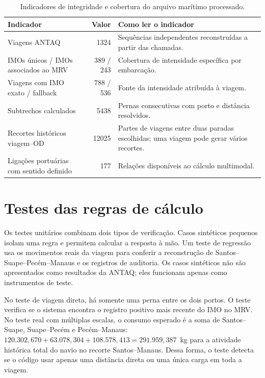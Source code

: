 \begin{table}[htbp]
\centering
\small
\caption{Indicadores de integridade e cobertura do arquivo marítimo processado.}
\label{tab:integridade-maritima}
\begin{tabularx}{\textwidth}{Y r Y}
\toprule
Indicador & Valor & Como ler o indicador \\
\midrule
Viagens ANTAQ & \num{1324} & Sequências independentes reconstruídas a partir das chamadas.\\
IMOs únicos / IMOs associados ao MRV & \num{389} / \num{243} & Cobertura de intensidade específica por embarcação.\\
Viagens com IMO exato / fallback & \num{788} / \num{536} & Fonte da intensidade atribuída à viagem.\\
Subtrechos calculados & \num{5438} & Pernas consecutivas com porto e distância resolvidos.\\
Recortes históricos viagem--OD & \num{12025} & Partes de viagens entre duas paradas escolhidas; uma viagem pode gerar vários recortes.\\
Ligações portuárias com sentido definido & \num{177} & Relações disponíveis ao cálculo multimodal.\\
\bottomrule
\end{tabularx}
\end{table}

\section{Testes das regras de cálculo}
\label{sec:testes-regras-maritimas}

Os testes unitários combinam dois tipos de verificação. Casos sintéticos pequenos isolam uma regra e permitem calcular a resposta à mão. Um teste de regressão usa os movimentos reais da viagem  para conferir a reconstrução de Santos--Suape--Pecém--Manaus e os registros de auditoria. Os casos sintéticos não são apresentados como resultados da ANTAQ; eles funcionam apenas como instrumentos de teste.

No teste de viagem direta, há somente uma perna entre os dois portos. O teste verifica se o sistema encontra o registro positivo mais recente do IMO no MRV. No teste real com múltiplas escalas, o consumo esperado é a soma de Santos--Suape, Suape--Pecém e Pecém--Manaus: \(120.302{,}670+63.078{,}304+108.578{,}413=291.959{,}387\)~kg para a atividade histórica total do navio no recorte Santos--Manaus. Dessa forma, o teste detecta se o código usar apenas uma distância direta ou uma única carga em toda a viagem.

